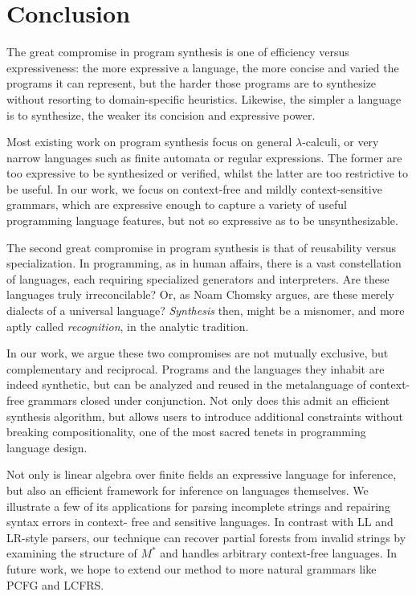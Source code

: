 \documentclass[sigplan,review,anonymous,acmsmall]{acmart}\settopmatter{printfolios=false,printccs=false,printacmref=false}
\begin{document}
\section{Conclusion}\label{sec:conclusion}

The great compromise in program synthesis is one of efficiency versus expressiveness: the more expressive a language, the more concise and varied the programs it can represent, but the harder those programs are to synthesize without resorting to domain-specific heuristics. Likewise, the simpler a language is to synthesize, the weaker its concision and expressive power.

Most existing work on program synthesis focus on general $\lambda$-calculi, or very narrow languages such as finite automata or regular expressions. The former are too expressive to be synthesized or verified, whilst the latter are too restrictive to be useful. In our work, we focus on context-free and mildly context-sensitive grammars, which are expressive enough to capture a variety of useful programming language features, but not so expressive as to be unsynthesizable.

The second great compromise in program synthesis is that of reusability versus specialization. In programming, as in human affairs, there is a vast constellation of languages, each requiring specialized generators and interpreters. Are these languages truly irreconcilable? Or, as Noam Chomsky argues, are these merely dialects of a universal language? \textit{Synthesis} then, might be a misnomer, and more aptly called \textit{recognition}, in the analytic tradition.

In our work, we argue these two compromises are not mutually exclusive, but complementary and reciprocal. Programs and the languages they inhabit are indeed synthetic, but can be analyzed and reused in the metalanguage of context-free grammars closed under conjunction. Not only does this admit an efficient synthesis algorithm, but allows users to introduce additional constraints without breaking compositionality, one of the most sacred tenets in programming language design.

Not only is linear algebra over finite fields an expressive language for inference, but also an efficient framework for inference on languages themselves. We illustrate a few of its applications for parsing incomplete strings and repairing syntax errors in context- free and sensitive languages. In contrast with LL and LR-style parsers, our technique can recover partial forests from invalid strings by examining the structure of $M^*$ and handles arbitrary context-free languages. In future work, we hope to extend our method to more natural grammars like PCFG and LCFRS.
\end{document}
